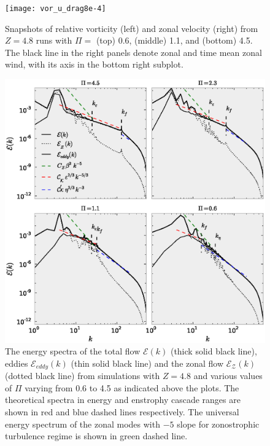 \documentclass{ametsoc}
\begin{document}
\begin{figure}
\begin{center}
\texttt{[image: vor\_u\_drag8e-4]}\caption{Snapshots of relative vorticity (left) and zonal velocity (right)
from $Z=4.8$ runs with $\Pi=$ (top) 0.6, (middle) 1.1, and (bottom)
4.5. The black line in the right panels denote zonal and time mean
zonal wind, with its axis in the bottom right subplot.}
\label{vor_u_snapshot_drag8e-4}
\end{center}
\end{figure}


\begin{figure}
\begin{center}
\includegraphics[width=6in]{E_ZKE_EKE_spectra_drag8e-4}\caption{The energy spectra of the total flow $\mathcal{E}(k)$ (thick solid
black line), eddies $\mathcal{E}_{eddy}(k)$ (thin solid black line)
and the zonal flow $\mathcal{E}_{\mathcal{Z}}(k)$ (dotted black line)
from simulations with $Z=4.8$ and various values of $\Pi$ varying
from 0.6 to 4.5 as indicated above the plots. The theoretical spectra
in energy and enstrophy cascade ranges are shown in red and blue dashed
lines respectively. The universal energy spectrum of the zonal modes
with $-5$ slope for zonostrophic turbulence regime is shown in green
dashed line.}
\label{E_EKE_ZKE_spectrum_drag8e-4}
\end{center}
\end{figure}
\end{document}
